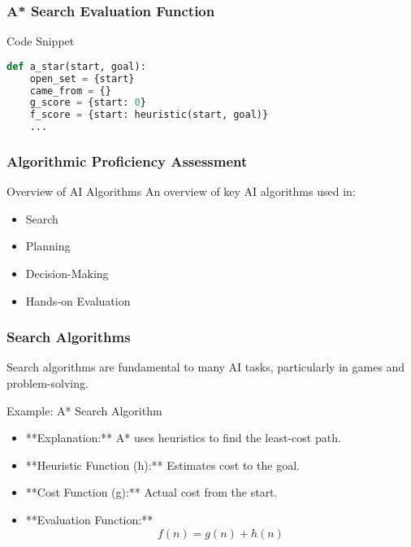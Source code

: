\documentclass[aspectratio=169]{beamer}
\begin{document}
\begin{frame}[fragile]
    \frametitle{A* Search Evaluation Function}
    \begin{block}{Code Snippet}
        \begin{lstlisting}[language=Python]
def a_star(start, goal):
    open_set = {start}
    came_from = {}
    g_score = {start: 0}
    f_score = {start: heuristic(start, goal)}
    ...
        \end{lstlisting}
    \end{block}
\end{frame}

\begin{frame}[fragile]
    \frametitle{Algorithmic Proficiency Assessment}
    \begin{block}{Overview of AI Algorithms}
        An overview of key AI algorithms used in:
        \begin{itemize}
            \item Search
            \item Planning
            \item Decision-Making
            \item Hands-on Evaluation
        \end{itemize}
    \end{block}
\end{frame}

\begin{frame}[fragile]
    \frametitle{Search Algorithms}
    Search algorithms are fundamental to many AI tasks, particularly in games and problem-solving.

    \begin{block}{Example: A* Search Algorithm}
        \begin{itemize}
            \item **Explanation:** A* uses heuristics to find the least-cost path.
            \item **Heuristic Function (h):** Estimates cost to the goal.
            \item **Cost Function (g):** Actual cost from the start.
            \item **Evaluation Function:** 
                \begin{equation}
                    f(n) = g(n) + h(n)
                \end{equation}
        \end{itemize}
    \end{block}
\end{frame}
\end{document}
